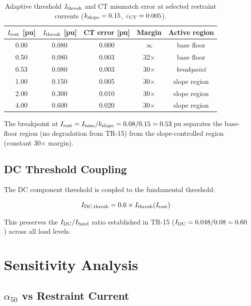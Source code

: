\documentclass[11pt, a4paper]{article}
\begin{document}
\begin{table}[h]
  \centering
  \caption{Adaptive threshold $I_{\rm thresh}$ and CT mismatch error at
           selected restraint currents ($k_{\rm slope}=0.15$,
           $\varepsilon_{\rm CT}=0.005$).}
  \label{tab:char}
  \begin{tabular}{ccccc}
    \toprule
    $I_{\rm rest}$ [pu] & $I_{\rm thresh}$ [pu] & CT error [pu] & Margin & Active region \\
    \midrule
    0.00 & 0.080 & 0.000 & $\infty$ & base floor \\
    0.50 & 0.080 & 0.003 & 32$\times$ & base floor \\
    0.53 & 0.080 & 0.003 & 30$\times$ & \textit{breakpoint} \\
    1.00 & 0.150 & 0.005 & 30$\times$ & slope region \\
    2.00 & 0.300 & 0.010 & 30$\times$ & slope region \\
    4.00 & 0.600 & 0.020 & 30$\times$ & slope region \\
    \bottomrule
  \end{tabular}
\end{table}

The breakpoint at $I_{\rm rest} = I_{\rm base}/k_{\rm slope}
= 0.08/0.15 = 0.53$\,pu separates the base-floor region (no degradation
from TR-15) from the slope-controlled region (constant 30$\times$ margin).

\subsection{DC Threshold Coupling}

The DC component threshold is coupled to the fundamental threshold:

\begin{equation}
  I_{\rm DC,thresh} = 0.6 \times I_{\rm thresh}(I_{\rm rest})
\end{equation}

This preserves the $I_{\rm DC}/I_{\rm fund}$ ratio established in TR-15
($I_{\rm DC} = 0.048/0.08 = 0.60$) across all load levels.


\section{Sensitivity Analysis}
\label{sec:sensitivity}

\subsection{$\alpha_{50}$ vs Restraint Current}
\end{document}
